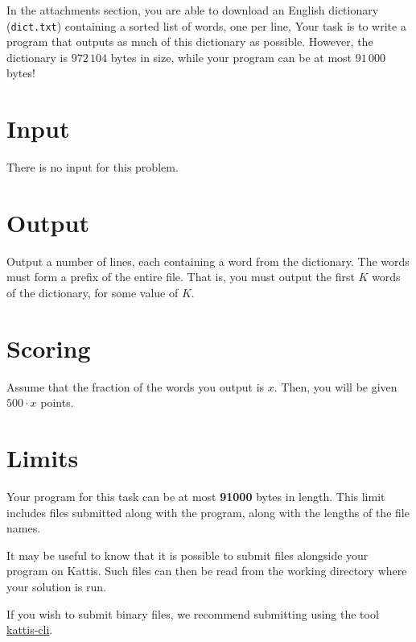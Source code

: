 In the attachments section, you are able to download an English dictionary (\texttt{dict.txt}) containing a sorted list of words, one per line,
Your task is to write a program that outputs as much of this dictionary as possible.
However, the dictionary is $972\,104$ bytes in size, while your program can be at most $91\,000$ bytes!

\section*{Input}
There is no input for this problem.

\section*{Output}
Output a number of lines, each containing a word from the dictionary.
The words must form a prefix of the entire file.
That is, you must output the first $K$ words of the dictionary, for some value of $K$.

\section*{Scoring}
Assume that the fraction of the words you output is $x$. Then, you will be given $500 \cdot x$ points.

\section*{Limits}
Your program for this task can be at most \textbf{91000} bytes in length.
This limit includes files submitted along with the program, along with the lengths of the file names.

It may be useful to know that it is possible to submit files alongside your program on Kattis.
Such files can then be read from the working directory where your solution is run.

If you wish to submit binary files, we recommend submitting using the tool \href{https://github.com/Kattis/kattis-cli}{kattis-cli}.
